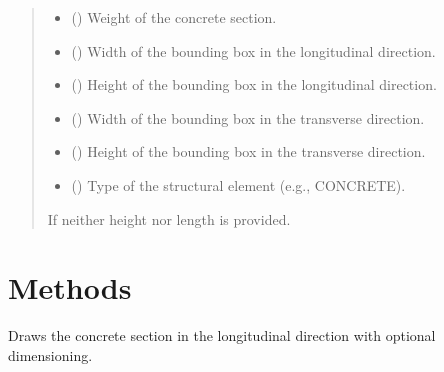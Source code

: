 \documentclass[a4paper,10pt,english]{sphinxmanual}
\begin{document}
\begin{fulllineitems}
\begin{quote}
\begin{description}
\begin{itemize}
\item {} 
\sphinxAtStartPar
{} () \textendash{} Weight of the concrete section.

\item {} 
\sphinxAtStartPar
{} () \textendash{} Width of the bounding box in the longitudinal direction.

\item {} 
\sphinxAtStartPar
{} () \textendash{} Height of the bounding box in the longitudinal direction.

\item {} 
\sphinxAtStartPar
{} () \textendash{} Width of the bounding box in the transverse direction.

\item {} 
\sphinxAtStartPar
{} () \textendash{} Height of the bounding box in the transverse direction.

\item {} 
\sphinxAtStartPar
{} (\sphinxstyleliteralemphasis{\sphinxupquote{, }}) \textendash{} Type of the structural element (e.g., CONCRETE).

\end{itemize}

\sphinxAtStartPar
{} \textendash{} If neither height nor length is provided.

\end{description}\end{quote}


\section{Methods}
\label{\detokenize{API:methods}}\begin{description}
\sphinxAtStartPar
Draws the concrete section in the longitudinal direction with optional dimensioning.


\end{description}
\end{fulllineitems}
\end{document}

